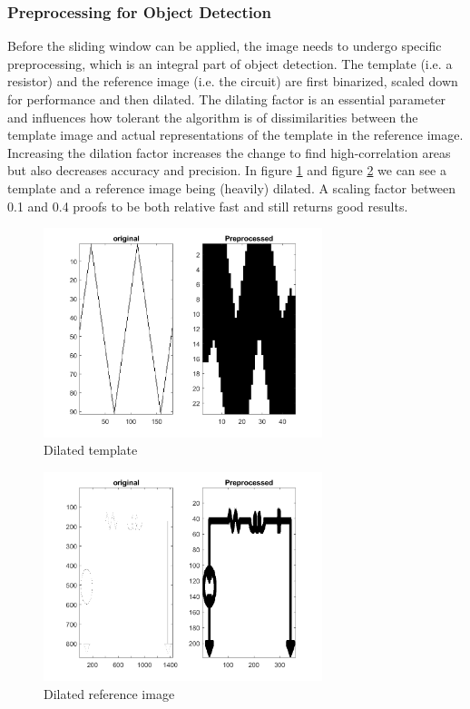 \documentclass[10pt,twocolumn,letterpaper]{article}
\begin{document}
\subsubsection*{Preprocessing for Object Detection}

Before the sliding window can be applied, the image needs to undergo specific preprocessing, which is an integral part of object detection. The template (i.e. a resistor) and the reference image (i.e. the circuit) are first binarized, scaled down for performance and then dilated. The dilating factor is an essential parameter and influences how tolerant the algorithm is of dissimilarities between the template image and actual representations of the template in the reference image. Increasing the dilation factor increases the change to find high-correlation areas but also decreases accuracy and precision. In figure \ref{fig:detPP1} and figure \ref{fig:detPP2} we can see a template and a reference image being (heavily) dilated. A scaling factor between 0.1 and 0.4 proofs to be both relative fast and still returns good results.
\par

\begin{figure}[!ht]
\includegraphics[width = 3.2in]{img/detPP1.png}
\caption{Dilated template}
\label{fig:detPP1}
\end{figure}
\par

\begin{figure}[!ht]
\includegraphics[width = 3.2in]{img/detPP2.png}
\caption{Dilated reference image}
\label{fig:detPP2}
\end{figure}
\end{document}
